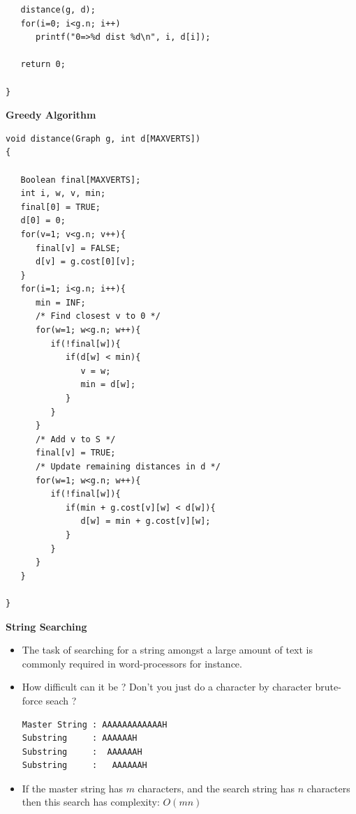 \documentclass[a4,portraitt]{slides}
\begin{document}
{{{\begin{verbatim}
   distance(g, d);
   for(i=0; i<g.n; i++)
      printf("0=>%d dist %d\n", i, d[i]);

   return 0;

}
\end{verbatim}
}}

\newpage
{\samepage
\begin{center}
{\Large{\bf Greedy Algorithm}}
\end{center}
{\small
\begin{verbatim}
void distance(Graph g, int d[MAXVERTS])
{

   Boolean final[MAXVERTS];
   int i, w, v, min;
   final[0] = TRUE;
   d[0] = 0;
   for(v=1; v<g.n; v++){
      final[v] = FALSE;
      d[v] = g.cost[0][v];
   }
   for(i=1; i<g.n; i++){
      min = INF;
      /* Find closest v to 0 */
      for(w=1; w<g.n; w++){
         if(!final[w]){
            if(d[w] < min){
               v = w;
               min = d[w];
            }
         }
      }
      /* Add v to S */
      final[v] = TRUE;
      /* Update remaining distances in d */
      for(w=1; w<g.n; w++){
         if(!final[w]){
            if(min + g.cost[v][w] < d[w]){
               d[w] = min + g.cost[v][w];
            }
         }
      }
   }

}
\end{verbatim}
}}


\newpage
{\samepage
\begin{center}
{\Large{\bf String Searching}}
\end{center}
\begin{itemize}
\item The task of searching for a string amongst a large
amount of text is commonly required in word-processors
for instance.
\item How difficult can it be ? Don't you just do a character by
character brute-force seach ?
\begin{verbatim}
Master String : AAAAAAAAAAAAH
Substring     : AAAAAAH
Substring     :  AAAAAAH
Substring     :   AAAAAAH
\end{verbatim}
\item If the master string has $m$ characters, and the search string
has $n$ characters then this search has complexity:
$O(mn)$
\end{itemize}
}

}
\end{document}
